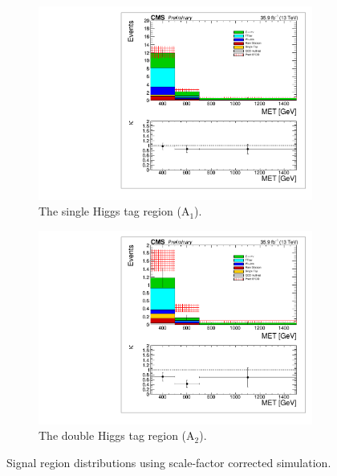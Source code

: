\begin{figure}
\centering
\begin{subfigure}[b]{0.49\textwidth}
\centering
\includegraphics[trim={5px 5px 5px 5px},clip,width=0.99\textwidth]{figs/MCclosureSF_singleHiggsRegionTotal.pdf}
\caption{The single Higgs tag region (A$_{1}$).}
\end{subfigure}
\begin{subfigure}[b]{0.49\textwidth}
\centering
\includegraphics[trim={5px 5px 5px 5px},clip,width=0.99\textwidth]{figs/MCclosureSF_doubleHiggsRegionTotal.pdf} 
\caption{The double Higgs tag region (A$_{2}$).}
\end{subfigure}
\caption[Signal region \ptmiss distributions using scale-factor corrected simulation.]{Signal region \ptmiss distributions using scale-factor corrected simulation. \cite{boostedan}}
\label{fig:MCclosuresf}
\end{figure}

